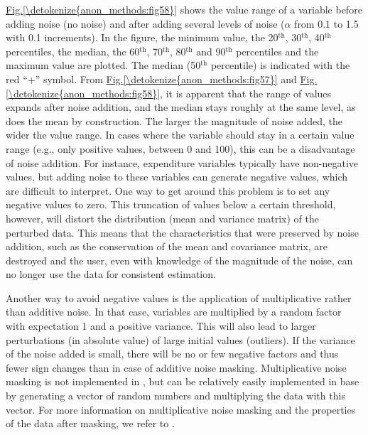\documentclass[letterpaper,10pt,english]{sphinxmanual}
\begin{document}
\hyperref[\detokenize{anon_methods:fig58}]{Fig.\@ \ref{\detokenize{anon_methods:fig58}}} shows the value range of a variable before adding noise (no
noise) and after adding several levels of noise (\(\alpha\) from 0.1
to 1.5 with 0.1 increments). In the figure, the minimum value, the
20$^{\text{th}}$, 30$^{\text{th}}$, 40$^{\text{th}}$ percentiles, the median, the
60$^{\text{th}}$, 70$^{\text{th}}$, 80$^{\text{th}}$ and 90$^{\text{th}}$
percentiles and the maximum value are plotted. The median (50$^{\text{th}}$
percentile) is indicated with the red “+” symbol. From \hyperref[\detokenize{anon_methods:fig57}]{Fig.\@ \ref{\detokenize{anon_methods:fig57}}} and
\hyperref[\detokenize{anon_methods:fig58}]{Fig.\@ \ref{\detokenize{anon_methods:fig58}}}, it is apparent that the range of values expands after noise
addition, and the median stays roughly at the same level, as does the
mean by construction. The larger the magnitude of noise added, the wider
the value range. In cases where the variable should stay in a certain
value range (e.g., only positive values, between 0 and 100), this can be
a disadvantage of noise addition. For instance, expenditure variables
typically have non-negative values, but adding noise to these variables
can generate negative values, which are difficult to interpret. One way
to get around this problem is to set any negative values to zero. This
truncation of values below a certain threshold, however, will distort
the distribution (mean and variance matrix) of the perturbed data. This
means that the characteristics that were preserved by noise addition,
such as the conservation of the mean and covariance matrix, are
destroyed and the user, even with knowledge of the magnitude of the
noise, can no longer use the data for consistent estimation.

Another way to avoid negative values is the application of
multiplicative rather than additive noise. In that case, variables are
multiplied by a random factor with expectation 1 and a positive
variance. This will also lead to larger perturbations (in absolute
value) of large initial values (outliers). If the variance of the noise
added is small, there will be no or few negative factors and thus fewer
sign changes than in case of additive noise masking. Multiplicative
noise masking is not implemented in , but can be relatively
easily implemented in base  by generating a vector of random numbers
and multiplying the data with this vector. For more information on
multiplicative noise masking and the properties of the data after
masking, we refer to {\hyperref[\detokenize{anon_methods:kiwi03}]{}}.
\end{document}
